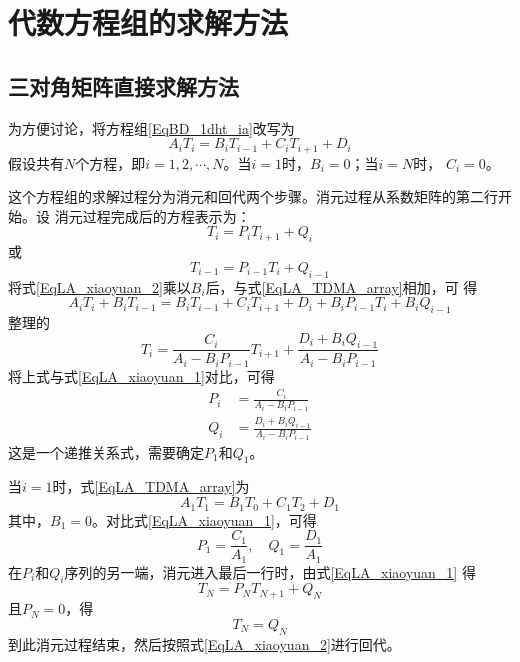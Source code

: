 \chapter{代数方程组的求解方法}
\section{三对角矩阵直接求解方法}
为方便讨论，将方程组\eqref{EqBD_1dht_ia}改写为
  \begin{equation}
    A_{i}T_{i} = B_{i}T_{i-1} + C_{i}T_{i+1} + D_{i}
    \label{EqLA_TDMA_array}
  \end{equation}
  假设共有$N$个方程，即$i=1,2,\cdots,N$。当$i=1$时，$B_{i}=0$；当$i=N$时，
  $C_{i}=0$。

  这个方程组的求解过程分为消元和回代两个步骤。消元过程从系数矩阵的第二行开始。设
  消元过程完成后的方程表示为：
  \begin{equation}
    T_{i} = P_{i}T_{i+1}+Q_{i}
    \label{EqLA_xiaoyuan_1}
  \end{equation}
  或
  \begin{equation}
    T_{i-1} = P_{i-1}T_{i} + Q_{i-1}
    \label{EqLA_xiaoyuan_2}
  \end{equation}
  将式\eqref{EqLA_xiaoyuan_2}乘以$B_{i}$后，与式\eqref{EqLA_TDMA_array}相加，可
  得
 \begin{equation}
   A_{i}T_{i} + B_{i}T_{i-1} = B_{i}T_{i-1}+C_{i}T_{i+1}+D_{i} +
   B_{i}P_{i-1}T_{i} + B_{i}Q_{i-1}
 \end{equation} 
整理的
\begin{equation}
  T_{i} = 
  \frac{C_{i}}{A_{i}-B_{i}P_{i-1}}T_{i+1} +
  \frac{D_{i}+B_{i}Q_{i-1}}{A_{i}-B_{i}P_{i-1}}
\end{equation}
将上式与式\eqref{EqLA_xiaoyuan_1}对比，可得
\begin{equation}
\begin{aligned}
  P_{i} 
  &=
\frac{C_{i}}{A_{i}-B_{i}P_{i-1}} \\
Q_{i}
  &=
  \frac{D_{i}+B_{i}Q_{i-1}}{A_{i}-B_{i}P_{i-1}}
\end{aligned}
\end{equation}
这是一个递推关系式，需要确定$P_{1}$和$Q_{1}$。

当$i=1$时，式\eqref{EqLA_TDMA_array}为
\begin{equation}
  A_{1}T_{1} = B_{1}T_{0} + C_{1}T_{2} + D_{1}
\end{equation}
其中，$B_{1}=0$。对比式\eqref{EqLA_xiaoyuan_1}，可得
\begin{equation}
  P_{1} = \frac{C_{1}}{A_{1}},\quad
  Q_{1} = \frac{D_{1}}{A_{1}}
\end{equation}
在$P_{i}$和$Q_{i}$序列的另一端，消元进入最后一行时，由式\eqref{EqLA_xiaoyuan_1}
得
\begin{equation}
  T_{N} = P_{N}T_{N+1}+Q_{N}
\end{equation}
且$P_{N}=0$，得
\begin{equation}
  T_{N} = Q_{N}
\end{equation}
到此消元过程结束，然后按照式\eqref{EqLA_xiaoyuan_2}进行回代。

